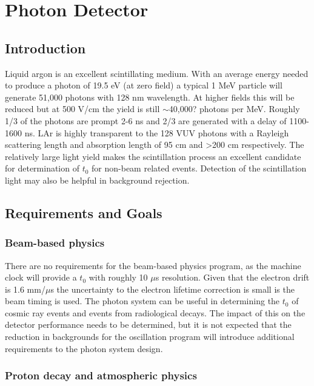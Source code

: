 \chapter{Photon Detector}
\label{ch:photon}
\section{Introduction}

Liquid argon is an excellent scintillating medium. With an average energy needed to produce a photon of 19.5 eV (at zero field) a typical 1 MeV particle will generate 51,000 photons with 128 nm wavelength. At higher fields this will be reduced but at 500 V/cm the yield is still $\sim$40,000? %
photons per MeV. Roughly 1/3 of the photons are prompt 2-6 ns and 2/3 are generated with a delay of 1100-1600 ns. LAr is highly transparent to the 128 VUV photons with a Rayleigh scattering length and absorption length of 95 cm and >200 cm respectively. The relatively large light yield makes the scintillation process an excellent candidate for determination of $t_{0}$ for non-beam related events. Detection of the scintillation light may also be helpful in background rejection.

\section{Requirements and Goals}

\subsection{Beam-based physics}

There are no requirements for the beam-based physics program, as the machine clock will provide a $t_{0}$ with roughly 10 $\mu$s resolution. Given that the electron drift is 1.6 mm/$\mu$s the uncertainty to the electron lifetime correction is small is the beam timing is used. The photon system can be useful in determining the $t_{0}$ of cosmic ray events and events from radiological decays. The impact of this on the detector performance needs to be determined, but it is not expected that the reduction in backgrounds for the oscillation program will introduce additional requirements to the photon system design.


\subsection{Proton decay and atmospheric physics}

